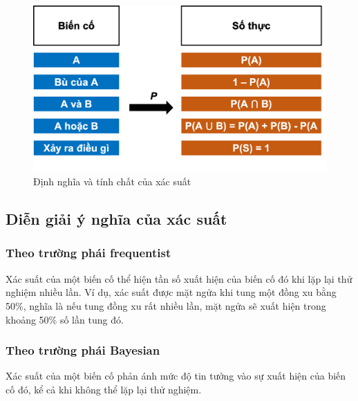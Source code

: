 \documentclass[
]{book}
\begin{document}
\begin{figure}

{\centering \includegraphics[width=1\linewidth]{figures/Picture05} 

}

\caption{Định nghĩa và tính chất của xác suất}\label{fig:generaldefinition}
\end{figure}

\hypertarget{diux1ec5n-giux1ea3i-uxfd-nghux129a-cux1ee7a-xuxe1c-suux1ea5t}{%
\subsection{Diễn giải ý nghĩa của xác suất}\label{diux1ec5n-giux1ea3i-uxfd-nghux129a-cux1ee7a-xuxe1c-suux1ea5t}}

\hypertarget{theo-trux1b0ux1eddng-phuxe1i-frequentist}{%
\subsubsection{Theo trường phái frequentist}\label{theo-trux1b0ux1eddng-phuxe1i-frequentist}}

Xác suất của một biến cố thể hiện tần số xuất hiện của biến cố đó khi lặp lại thử nghiệm nhiều lần. Ví dụ, xác suất được mặt ngửa khi tung một đồng xu bằng 50\%, nghĩa là nếu tung đồng xu rất nhiều lần, mặt ngửa sẽ xuất hiện trong khoảng 50\% số lần tung đó.

\hypertarget{theo-trux1b0ux1eddng-phuxe1i-bayesian}{%
\subsubsection{Theo trường phái Bayesian}\label{theo-trux1b0ux1eddng-phuxe1i-bayesian}}

Xác suất của một biến cố phản ánh mức độ tin tưởng vào sự xuất hiện của biến cố đó, kể cả khi không thể lặp lại thử nghiệm.
\end{document}
